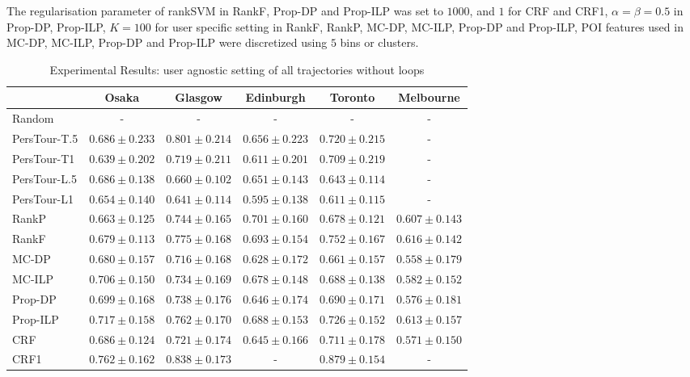 The regularisation parameter of rankSVM in RankF, Prop-DP and Prop-ILP was set to $1000$, and $1$ for CRF and CRF1,
$\alpha=\beta=0.5$ in Prop-DP, Prop-ILP, 
$K=100$ for user specific setting in RankF, RankP, MC-DP, MC-ILP, Prop-DP and Prop-ILP,
POI features used in MC-DP, MC-ILP, Prop-DP and Prop-ILP were discretized using $5$ bins or clusters.



\begin{table*}
\centering
\caption{Experimental Results: user agnostic setting of all trajectories without loops}
\begin{tabular}{l|ccccc} \hline
 & Osaka & Glasgow & Edinburgh & Toronto & Melbourne \\ \hline
Random & - & - & - & - & - \\
PersTour-T.5 & $0.686\pm0.233$ & $0.801\pm0.214$ & $0.656\pm0.223$ & $0.720\pm0.215$ & - \\
PersTour-T1 & $0.639\pm0.202$ & $0.719\pm0.211$ & $0.611\pm0.201$ & $0.709\pm0.219$ & - \\
PersTour-L.5 & $0.686\pm0.138$ & $0.660\pm0.102$ & $0.651\pm0.143$ & $0.643\pm0.114$ & - \\
PersTour-L1 & $0.654\pm0.140$ & $0.641\pm0.114$ & $0.595\pm0.138$ & $0.611\pm0.115$ & - \\
RankP & $0.663\pm0.125$ & $0.744\pm0.165$ & $0.701\pm0.160$ & $0.678\pm0.121$ & $0.607\pm0.143$ \\
RankF & $0.679\pm0.113$ & $0.775\pm0.168$ & $0.693\pm0.154$ & $0.752\pm0.167$ & $0.616\pm0.142$ \\
MC-DP & $0.680\pm0.157$ & $0.716\pm0.168$ & $0.628\pm0.172$ & $0.661\pm0.157$ & $0.558\pm0.179$ \\
MC-ILP & $0.706\pm0.150$ & $0.734\pm0.169$ & $0.678\pm0.148$ & $0.688\pm0.138$ & $0.582\pm0.152$ \\
Prop-DP & $0.699\pm0.168$ & $0.738\pm0.176$ & $0.646\pm0.174$ & $0.690\pm0.171$ & $0.576\pm0.181$ \\
Prop-ILP & $0.717\pm0.158$ & $0.762\pm0.170$ & $0.688\pm0.153$ & $0.726\pm0.152$ & $0.613\pm0.157$ \\
CRF & $0.686\pm0.124$ & $0.721\pm0.174$ & $0.645\pm0.166$ & $0.711\pm0.178$ & $0.571\pm0.150$ \\
CRF1 & $\mathbf{0.762\pm0.162}$ & $\mathbf{0.838\pm0.173}$ & - & $\mathbf{0.879\pm0.154}$ & - \\
\hline
\end{tabular}
\end{table*}

